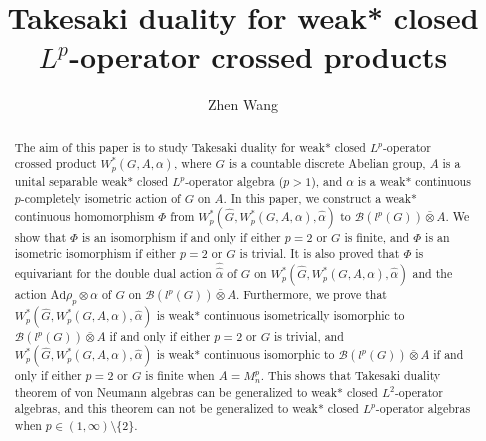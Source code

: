 \documentclass[reqno,11pt]{amsart}
\theoremstyle{plain}
\theoremstyle{definition}
\theoremstyle{remark}
\begin{document}
\title[]{Takesaki duality for weak* closed $L^p$-operator crossed products}


\author[Z. Wang]{Zhen Wang}
\address{School of Mathematics\\HangZhou Normal University \\HangZhou 311121\\
P. R. China}




\begin{abstract}
The aim of this paper is to study  Takesaki duality for weak* closed $L^p$-operator crossed product $W^*_p(G,A,\alpha)$, where $G$ is a countable discrete Abelian group, $A$ is a unital separable weak* closed $L^p$-operator algebra ($p>1$), and $\alpha$ is a weak* continuous $p$-completely isometric action of $G$ on $A$. In this paper, we construct a weak* continuous homomorphism  $\Phi$ from $W^*_p(\hat{G},W^*_p(G,A,\alpha),\hat{\alpha})$ to $\mathcal{B}(l^{p}(G))\bar{\otimes}A$. We show that $\Phi$ is an isomorphism if and only if either $p=2$ or $G$ is finite, and $\Phi$ is an isometric isomorphism if either $p=2$ or $G$ is trivial.  It is also proved that $\Phi$ is equivariant for the double dual action $\hat{\hat{\alpha}}$ of $G$ on $W^*_p(\hat{G},W^*_p(G,A,\alpha),\hat{\alpha})$ and the action $\mathrm{Ad}\rho_p\otimes\alpha$ of $G$ on $\mathcal{B}(l^p(G))\bar{\otimes} A$.
Furthermore, we prove that  $W^*_p(\hat{G},W^*_p(G,A,\alpha),\hat{\alpha})$ is weak* continuous isometrically isomorphic to $\mathcal{B}(l^{p}(G))\bar{\otimes}A$ if and only if either $p=2$ or $G$ is trivial, and $W^*_p(\hat{G},W^*_p(G,A,\alpha),\hat{\alpha})$ is weak* continuous isomorphic to $\mathcal{B}(l^{p}(G))\bar{\otimes}A$ if and only if either $p=2$ or $G$ is finite when $A=M_n^p$. This shows that  Takesaki duality theorem of von Neumann algebras can be generalized to weak* closed $L^2$-operator algebras, and this theorem can not be generalized to  weak* closed $L^p$-operator algebras when $p\in (1,\infty)\setminus\{2\}$.
\end{abstract}
\end{document}
